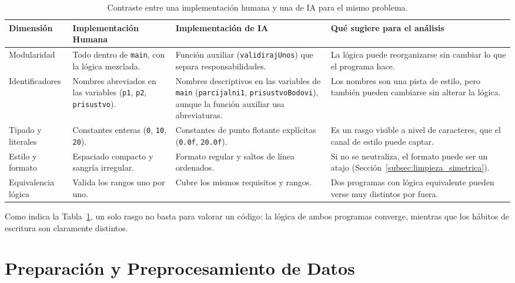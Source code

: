 \begin{table}[H]
    \centering
    \caption{Contraste entre una implementación humana y una de IA para el mismo problema.}
    \label{tab:caso_estudio_humano_ia}
    \renewcommand{\arraystretch}{1.25}
    \small
    \begin{tabularx}{\textwidth}{|l|X|X|X|}
        \hline
        \textbf{Dimensión} & \textbf{Implementación Humana} & \textbf{Implementación de IA} & \textbf{Qué sugiere para el análisis} \\ \hline
        Modularidad & Todo dentro de \texttt{main}, con la lógica mezclada. & Función auxiliar (\texttt{validirajUnos}) que separa responsabilidades. & La lógica puede reorganizarse sin cambiar lo que el programa hace. \\ \hline
        Identificadores & Nombres abreviados en las variables (\texttt{p1}, \texttt{p2}, \texttt{prisustvo}). & Nombres descriptivos en las variables de \texttt{main} (\texttt{parcijalni1}, \texttt{prisustvoBodovi}), aunque la función auxiliar usa abreviaturas. & Los nombres son una pista de estilo, pero también pueden cambiarse sin alterar la lógica. \\ \hline
        Tipado y literales & Constantes enteras (\texttt{0}, \texttt{10}, \texttt{20}). & Constantes de punto flotante explícitas (\texttt{0.0f}, \texttt{20.0f}). & Es un rasgo visible a nivel de caracteres, que el canal de estilo puede captar. \\ \hline
        Estilo y formato & Espaciado compacto y sangría irregular. & Formato regular y saltos de línea ordenados. & Si no se neutraliza, el formato puede ser un atajo (Sección~\ref{subsec:limpieza_simetrica}). \\ \hline
        Equivalencia lógica & Valida los rangos uno por uno. & Cubre los mismos requisitos y rangos. & Dos programas con lógica equivalente pueden verse muy distintos por fuera. \\ \hline
    \end{tabularx}
\end{table}

Como indica la Tabla~\ref{tab:caso_estudio_humano_ia}, un solo rasgo no basta para valorar un código: la lógica de ambos programas converge, mientras que los hábitos de escritura son claramente distintos.

\section{Preparación y Preprocesamiento de Datos}
\label{sec:preparacion_datos}

